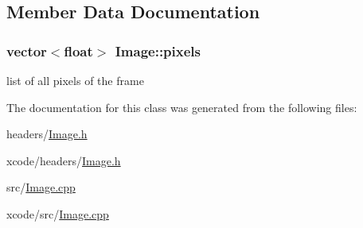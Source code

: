 \subsection{Member Data Documentation}
\hypertarget{class_image_ac22dddb0c4b1136c745f0dce6db7a1dc}{
\subsubsection[{pixels}]{\setlength{\rightskip}{0pt plus 5cm}vector$<$float$>$ Image\-::pixels}}\label{class_image_ac22dddb0c4b1136c745f0dce6db7a1dc}


list of all pixels of the frame 



The documentation for this class was generated from the following files\-:\begin{DoxyCompactItemize}
\item 
headers/\hyperlink{headers_2_image_8h}{Image.\-h}\item 
xcode/headers/\hyperlink{xcode_2headers_2_image_8h}{Image.\-h}\item 
src/\hyperlink{src_2_image_8cpp}{Image.\-cpp}\item 
xcode/src/\hyperlink{xcode_2src_2_image_8cpp}{Image.\-cpp}\end{DoxyCompactItemize}
